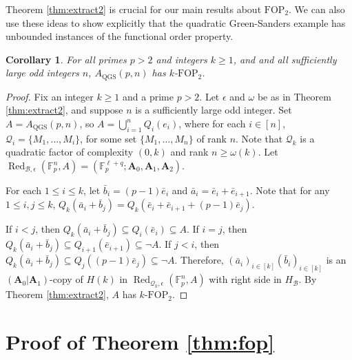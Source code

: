 \documentclass[12pt,oneside,british,a4wide]{amsart}
\newtheorem{corollary}[theorem]{Corollary}
\numberwithin{equation}{section}
\theoremstyle{definition}
\def\F{\mathbb{F}}
\def\FOP{\mathrm{FOP}}
\def\QGS{\mathrm{QGS}}
\def\e{\epsilon}
\newcommand{\abar}{\bar{a}}
\newcommand{\bbar}{\bar{b}}
\newcommand{\ebar}{\bar{e}}
\newcommand{\calB}{\mathcal{B}}
\newcommand{\calQ}{\mathcal{Q}}
\newcommand{\Red}{{\mathrm{Red}}}
\def\Red{\operatorname{Red}}
\begin{document}
Theorem \ref{thm:extract2} is crucial for our main results about $\FOP_2$.  We can also use these ideas to show explicitly that the quadratic Green-Sanders example has unbounded instances of the functional order property. 


\begin{corollary}\label{cor:qgscor}
For all primes $p>2$ and integers $k\geq 1$, and and all sufficiently large odd integers $n$, $A_{\QGS}(p,n)$ has $k$-$\FOP_2$.
\end{corollary}
\begin{proof}
Fix an integer $k\geq 1$ and a prime $p>2$. Let $\e$ and $\omega$ be as in Theorem \ref{thm:extract2}, and suppose $n$ is a sufficiently large odd integer.  Set $A=A_{\QGS}(p,n)$, so $A=\bigcup_{i=1}^nQ_i(e_i)$, where for each $i\in [n]$, $\calQ_i=\{M_1,\ldots, M_i\}$, for some set $\{M_1,\ldots, M_n\}$ of rank $n$. Note that $\calQ_k$ is a quadratic factor of complexity $(0,k)$ and rank $n\geq \omega(k)$. Let $\Red_{\calB,\e}(\F_p^n,A)=(\F_p^{\ell+q};\mathbf{A}_0,\mathbf{A}_1,\mathbf{A}_2)$.

For each $1\leq i\leq k$, let $\bbar_i=(p-1)\ebar_{i}$ and $\abar_i=\ebar_{i}+\ebar_{i+1}$.  Note that for any $1\leq i,j\leq k$, $Q_k(\abar_i+\bbar_j)=Q_k(\ebar_{i}+\ebar_{i+1}+(p-1)\ebar_{j})$.  

If $i< j$, then $Q_k(\abar_i+\bbar_j)\subseteq Q_i(\ebar_i)\subseteq A$.  If $i=j$, then $Q_k(\abar_i+\bbar_j)\subseteq Q_{i+1}(\ebar_{i+1})\subseteq \neg A$.  If $j<i$, then $Q_k(\abar_i+\bbar_j)\subseteq Q_{j}((p-1)\ebar_{j})\subseteq\neg A$.  Therefore, $(\abar_i)_{i\in [k]}(\bbar_i)_{i\in [k]}$ is an $(\mathbf{A}_0|\mathbf{A}_1)$-copy of $H(k)$ in $\Red_{\calQ_k, \e}(\F_p^n,A)$ with right side in $H_{\calB}$. By Theorem \ref{thm:extract2}, $A$ has $k$-$\FOP_2$. 
\end{proof}





\section{Proof of Theorem \ref{thm:fop}}\label{sec:FOP}
\end{document}
